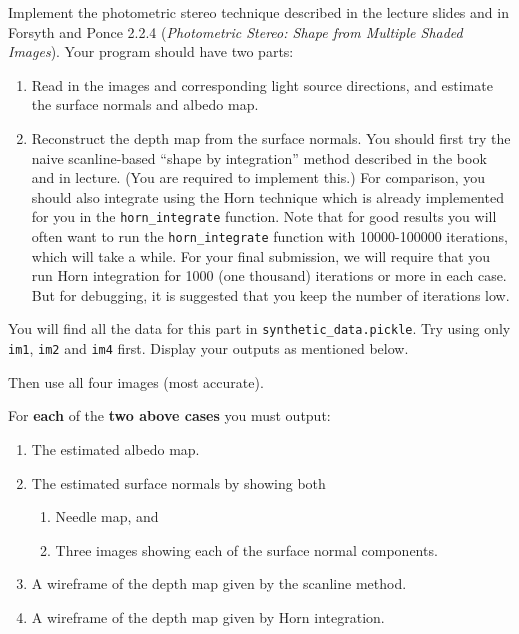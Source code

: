 \documentclass[11pt]{article}
\providecommand{\tightlist}{%
      \setlength{\itemsep}{0pt}\setlength{\parskip}{0pt}}
\begin{document}
Implement the photometric stereo technique described in the lecture
slides and in Forsyth and Ponce 2.2.4 (\emph{Photometric Stereo: Shape
from Multiple Shaded Images}). Your program should have two parts:

\begin{enumerate}
\def\labelenumi{\arabic{enumi}.}
\item
  Read in the images and corresponding light source directions, and
  estimate the surface normals and albedo map.
\item
  Reconstruct the depth map from the surface normals. You should first
  try the naive scanline-based ``shape by integration'' method described
  in the book and in lecture. (You are required to implement this.) For
  comparison, you should also integrate using the Horn technique which
  is already implemented for you in the \texttt{horn\_integrate}
  function. Note that for good results you will often want to run the
  \texttt{horn\_integrate} function with 10000-100000 iterations, which
  will take a while. For your final submission, we will require that you
  run Horn integration for 1000 (one thousand) iterations or more in
  each case. But for debugging, it is suggested that you keep the number
  of iterations low.
\end{enumerate}

You will find all the data for this part in
\texttt{synthetic\_data.pickle}. Try using only \texttt{im1},
\texttt{im2} and \texttt{im4} first. Display your outputs as mentioned
below.

Then use all four images (most accurate).

For \textbf{each} of the \textbf{two above cases} you must output:

\begin{enumerate}
\def\labelenumi{\arabic{enumi}.}
\item
  The estimated albedo map.
\item
  The estimated surface normals by showing both

  \begin{enumerate}
  \def\labelenumii{\arabic{enumii}.}
  \tightlist
  \item
    Needle map, and
  \item
    Three images showing each of the surface normal components.
  \end{enumerate}
\item
  A wireframe of the depth map given by the scanline method.
\item
  A wireframe of the depth map given by Horn integration.
\end{enumerate}
\end{document}
